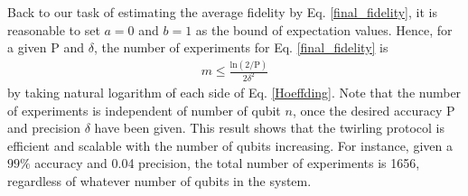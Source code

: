 \documentclass[prl,twocolumn,showpacs]{revtex4-1}
\begin{document}
Back to our task of estimating the average fidelity by Eq. \ref{final_fidelity}, it is reasonable to set $a=0$ and $b=1$ as the bound of expectation values. Hence, for a given $\text{P}$ and $\delta$, the number of experiments for Eq. \ref{final_fidelity} is
\begin{align} \label{exp_number}
m\leq \frac{\text{ln}(2/\text{P})}{2\delta^2}
\end{align}
by taking natural logarithm of each side of Eq. \ref{Hoeffding}. Note that the number of experiments is independent of number of qubit $n$, once the desired accuracy $\text{P}$ and precision $\delta$ have been given. This result shows that the twirling protocol is efficient and scalable with the number of qubits increasing. For instance, given a $99\%$ accuracy and 0.04 precision, the total number of experiments is 1656, regardless of whatever number of qubits in the system.
\end{document}
